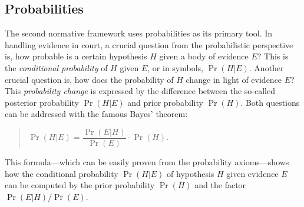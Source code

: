 \documentclass[10pt]{article}
\begin{document}
\subsection{Probabilities}
\label{sec:normfram:prob}
The second normative framework %
uses probabilities as its primary tool. 
In handling evidence in court, a crucial question from the probabilistic perspective is, 
how probable is a certain hypothesis $H$ given a body of evidence $E$? This is 
the \textit{conditional probability} of $H$ given $E$, or in symbols, $\Pr(H|E)$. 
Another crucial question is, how does the probability of $H$ 
change in light of evidence $E$? This \textit{probability change} is expressed by 
the difference between the so-called posterior probability $\Pr(H|E)$ and prior 
probability $\Pr(H)$.
Both questions can be addressed with 
the famous Bayes' theorem:
%
\begin{quotation}
	$\Pr(H|E) = \dfrac{\Pr(E|H)}{\Pr(E)}\cdot\Pr(H)$.
\end{quotation}
%
This formula---which can be easily proven from 
the probability axioms---shows how the 
conditional probability $\Pr(H|E)$ of hypothesis $H$ given evidence $E$ 
can be computed by the prior probability $\Pr(H)$ and the 
factor $\Pr(E|H)/\Pr(E)$. 
\end{document}

